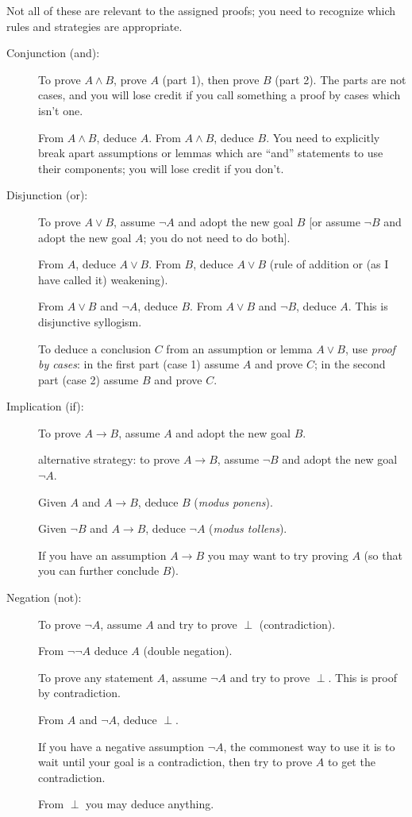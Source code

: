 \documentclass[12pt]{article}
\begin{document}
Not all of these are relevant to the assigned proofs; you need to
recognize which rules and strategies are appropriate.

\begin{description}

\item[Conjunction (and):]  To prove $A \wedge B$, prove $A$ (part 1), then prove $B$ (part 2).  The parts are not cases, and you will lose credit if you call something a proof by cases which isn't one.

From $A \wedge B$, deduce $A$.  From $A \wedge B$, deduce $B$.  You
need to explicitly break apart assumptions or lemmas which are ``and''
statements to use their components; you will lose credit if you don't.

\item[Disjunction (or):]  To prove $A \vee B$, assume $\neg A$ and adopt the new goal $B$ [or assume $\neg
B$ and adopt the new goal $A$; you do not need to do both].

From $A$, deduce $A \vee B$.  From $B$, deduce $A \vee B$ (rule of addition or (as I have called it) weakening).

From $A \vee B$ and $\neg A$, deduce $B$.  From $A \vee B$ and $\neg B$, deduce $A$.  This is disjunctive syllogism.

To deduce a conclusion $C$ from an assumption or lemma $A \vee B$, use
{\em proof by cases\/}: in the first part (case 1) assume $A$ and
prove $C$; in the second part (case 2) assume $B$ and prove $C$.

\item[Implication (if):]  
To prove $A \rightarrow B$, assume $A$ and adopt the new goal $B$.

alternative strategy: to prove $A \rightarrow B$, assume $\neg B$ and
adopt the new goal $\neg A$.

Given $A$ and $A \rightarrow B$, deduce $B$ ({\em modus ponens\/}).

Given $\neg B$ and $A \rightarrow B$, deduce $\neg A$ ({\em modus tollens\/}).

If you have an assumption $A \rightarrow B$ you may want to try
proving $A$ (so that you can further conclude $B$).

\item[Negation (not):]  

To prove $\neg A$, assume $A$ and try to prove $\perp$ (contradiction).

From $\neg\neg A$ deduce $A$ (double negation).

To prove any statement $A$, assume $\neg A$ and try to prove $\perp$.  This is proof by contradiction.

From $A$ and $\neg A$, deduce $\perp$.

If you have a negative assumption $\neg A$, the commonest way to use
it is to wait until your goal is a contradiction, then try to prove
$A$ to get the contradiction.

From $\perp$ you may deduce anything.
\end{description}
\end{document}
